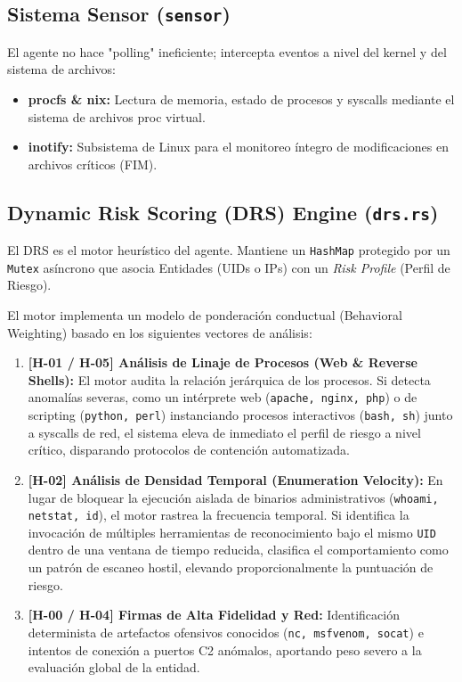 \documentclass[12pt,a4paper]{article}
\begin{document}
\subsection{Sistema Sensor (\texttt{sensor})}
El agente no hace "polling" ineficiente; intercepta eventos a nivel del kernel y del sistema de archivos:
\begin{itemize}
    \item \textbf{procfs \& nix:} Lectura de memoria, estado de procesos y syscalls mediante el sistema de archivos proc virtual.
    \item \textbf{inotify:} Subsistema de Linux para el monitoreo íntegro de modificaciones en archivos críticos (FIM).
\end{itemize}

\subsection{Dynamic Risk Scoring (DRS) Engine (\texttt{drs.rs})}
El DRS es el motor heurístico del agente. Mantiene un \texttt{HashMap} protegido por un \texttt{Mutex} asíncrono que asocia Entidades (UIDs o IPs) con un \textit{Risk Profile} (Perfil de Riesgo). 

El motor implementa un modelo de ponderación conductual (Behavioral Weighting) basado en los siguientes vectores de análisis:
\begin{enumerate}
    \item \textbf{[H-01 / H-05] Análisis de Linaje de Procesos (Web \& Reverse Shells):} El motor audita la relación jerárquica de los procesos. Si detecta anomalías severas, como un intérprete web (\texttt{apache, nginx, php}) o de scripting (\texttt{python, perl}) instanciando procesos interactivos (\texttt{bash, sh}) junto a syscalls de red, el sistema eleva de inmediato el perfil de riesgo a nivel crítico, disparando protocolos de contención automatizada.
    \item \textbf{[H-02] Análisis de Densidad Temporal (Enumeration Velocity):} En lugar de bloquear la ejecución aislada de binarios administrativos (\texttt{whoami, netstat, id}), el motor rastrea la frecuencia temporal. Si identifica la invocación de múltiples herramientas de reconocimiento bajo el mismo \texttt{UID} dentro de una ventana de tiempo reducida, clasifica el comportamiento como un patrón de escaneo hostil, elevando proporcionalmente la puntuación de riesgo.
    \item \textbf{[H-00 / H-04] Firmas de Alta Fidelidad y Red:} Identificación determinista de artefactos ofensivos conocidos (\texttt{nc, msfvenom, socat}) e intentos de conexión a puertos C2 anómalos, aportando peso severo a la evaluación global de la entidad.
\end{enumerate}
\end{document}
